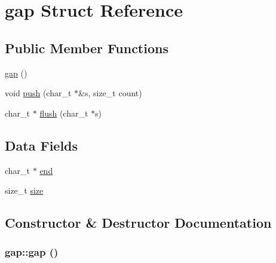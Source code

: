 \hypertarget{structgap}{
\section{gap Struct Reference}
\label{structgap}
}
\subsection*{Public Member Functions}
\begin{DoxyCompactItemize}
\item 
\hyperlink{structgap_a4ae36e370647da0df57eb30d3bbcd32b}{gap} ()
\item 
void \hyperlink{structgap_a9c0d0b12bc778c8439c8aec7747ab2b0}{push} (char\_\-t $\ast$\&s, size\_\-t count)
\item 
char\_\-t $\ast$ \hyperlink{structgap_a176c58ee8d57c41b91ae9f00d5e8cab5}{flush} (char\_\-t $\ast$s)
\end{DoxyCompactItemize}
\subsection*{Data Fields}
\begin{DoxyCompactItemize}
\item 
char\_\-t $\ast$ \hyperlink{structgap_a1fafd4d9909a3413f723f24e46dfde0e}{end}
\item 
size\_\-t \hyperlink{structgap_ad5bb3597ade78d89bbe0e300748ad508}{size}
\end{DoxyCompactItemize}


\subsection{Constructor \& Destructor Documentation}
\hypertarget{structgap_a4ae36e370647da0df57eb30d3bbcd32b}{
\subsubsection[{gap}]{\setlength{\rightskip}{0pt plus 5cm}gap::gap ()}}
\label{structgap_a4ae36e370647da0df57eb30d3bbcd32b}


